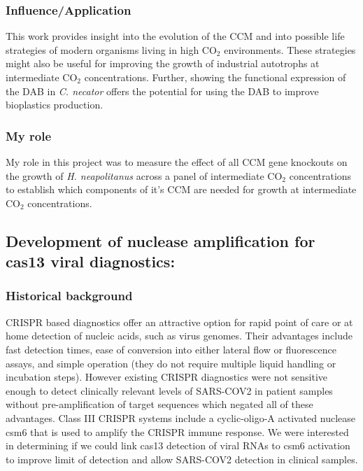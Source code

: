 \documentclass{article}
\begin{document}
\subsubsection{Influence/Application}
This work provides insight into the evolution of the CCM and into possible life strategies of modern organisms living in high CO$_2$ environments.
These strategies might also be useful for improving the growth of industrial autotrophs at intermediate CO$_2$ concentrations.
Further, showing the functional expression of the DAB in \textit{C. necator} offers the potential for using the DAB to improve bioplastics production.
%
\subsubsection{My role}
My role in this project was to measure the effect of all CCM gene knockouts on the growth of \textit{H. neapolitanus} across a panel of intermediate CO$_2$ concentrations to establish which components of it's CCM are needed for growth at intermediate CO$_2$ concentrations.
%
\nocite{Flamholz2022-yo}
\printbibliography[heading=none]

\leavevmode\pagebreak


\newrefsection
\subsection{Development of nuclease amplification for cas13 viral diagnostics:}
\subsubsection{Historical background}
CRISPR based diagnostics offer an attractive option for rapid point of care or at home detection of nucleic acids, such as virus genomes.
Their advantages include fast detection times, ease of conversion into either lateral flow or fluorescence assays, and simple operation (they do not require multiple liquid handling or incubation steps).
However existing CRISPR diagnostics were not sensitive enough to detect clinically relevant levels of SARS-COV2 in patient samples without pre-amplification of target sequences which negated all of these advantages.
Class III CRISPR systems include a cyclic-oligo-A activated nuclease csm6 that is used to amplify the CRISPR immune response.
We were interested in determining if we could link cas13 detection of viral RNAs to csm6 activation to improve limit of detection and allow SARS-COV2 detection in clinical samples.
%
\end{document}
